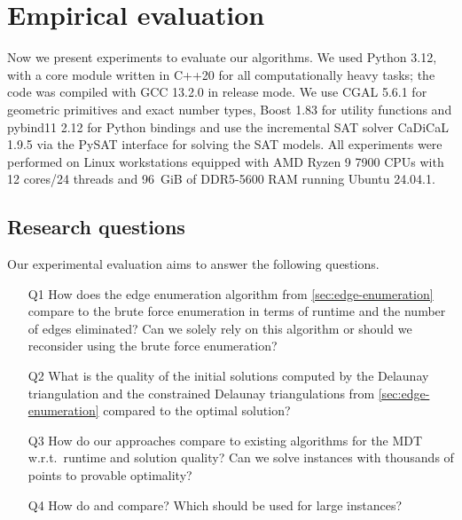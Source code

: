 \section{Empirical evaluation}
\label{sec:experiments}

Now we present experiments to evaluate our algorithms.
We used Python 3.12, with a core module written in C++20 for all computationally heavy tasks;
the code was compiled with GCC 13.2.0 in release mode.
We use CGAL 5.6.1 for geometric primitives and exact number types, Boost 1.83 for utility functions and pybind11 2.12 for Python bindings
and use the incremental SAT solver CaDiCaL 1.9.5 via the PySAT interface for solving the SAT models.
All experiments were performed on Linux workstations equipped with AMD Ryzen 9 7900 CPUs with 12 cores/24 threads and \qty{96}{GiB} of DDR5-5600 RAM running Ubuntu 24.04.1.

\subsection{Research questions}
Our experimental evaluation aims to answer the following questions.
\begin{enumerate}
  \item[Q1] How does the edge enumeration algorithm from \cref{sec:edge-enumeration} compare to the brute force enumeration in terms of runtime and the number of edges eliminated? 
            Can we solely rely on this algorithm or should we reconsider using the brute force enumeration?
  \item[Q2] What is the quality of the initial solutions computed by the Delaunay triangulation and the constrained Delaunay triangulations from \cref{sec:edge-enumeration} compared to the optimal solution?
  \item[Q3] How do our approaches compare to existing algorithms for the MDT w.r.t.\ runtime and solution quality?
            Can we solve instances with thousands of points to provable optimality?
  \item[Q4] How do \binmdt{} and \incmdt{} compare?
            Which should be used for large instances?
\end{enumerate}

